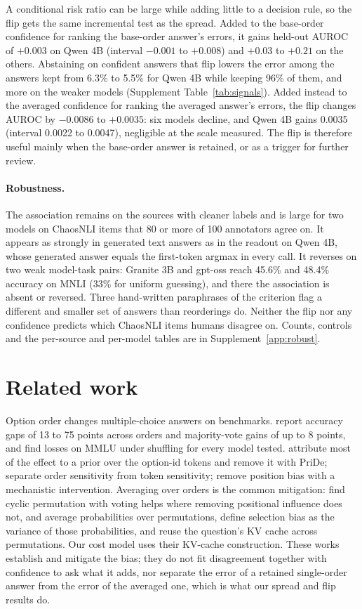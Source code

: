 \documentclass[10pt,twocolumn]{article}
\begin{document}
A conditional risk ratio can be large while adding little to a decision rule, so the flip gets the same incremental test as the spread. Added to the base-order confidence for ranking the base-order answer's errors, it gains held-out AUROC of $+0.003$ on Qwen 4B (interval $-0.001$ to $+0.008$) and $+0.03$ to $+0.21$ on the others. Abstaining on confident answers that flip lowers the error among the answers kept from 6.3\% to 5.5\% for Qwen 4B while keeping 96\% of them, and more on the weaker models (Supplement Table~\ref{tab:signals}). Added instead to the averaged confidence for ranking the averaged answer's errors, the flip changes AUROC by $-0.0086$ to $+0.0035$: six models decline, and Qwen 4B gains 0.0035 (interval 0.0022 to 0.0047), negligible at the scale measured. The flip is therefore useful mainly when the base-order answer is retained, or as a trigger for further review.

\paragraph{Robustness.} The association remains on the sources with cleaner labels and is large for two models on ChaosNLI items that 80 or more of 100 annotators agree on. It appears as strongly in generated text answers as in the readout on Qwen 4B, whose generated answer equals the first-token argmax in every call. It reverses on two weak model-task pairs: Granite 3B and gpt-oss reach 45.6\% and 48.4\% accuracy on MNLI (33\% for uniform guessing), and there the association is absent or reversed. Three hand-written paraphrases of the criterion flag a different and smaller set of answers than reorderings do. Neither the flip nor any confidence predicts which ChaosNLI items humans disagree on. Counts, controls and the per-source and per-model tables are in Supplement~\ref{app:robust}.

\section{Related work}

Option order changes multiple-choice answers on benchmarks. \citet{pezeshkpour2024order} report accuracy gaps of 13 to 75 points across orders and majority-vote gains of up to 8 points, and \citet{gupta2024changing} find losses on MMLU under shuffling for every model tested. \citet{zheng2024robust} attribute most of the effect to a prior over the option-id tokens and remove it with PriDe; \citet{wei2024unveiling} separate order sensitivity from token sensitivity; \citet{wang2024pine} remove position bias with a mechanistic intervention. Averaging over orders is the common mitigation: \citet{labelfree2026} find cyclic permutation with voting helps where removing positional influence does not, and \citet{guda2025rethinking} average probabilities over permutations, define selection bias as the variance of those probabilities, and reuse the question's KV cache across permutations. Our cost model uses their KV-cache construction. These works establish and mitigate the bias; they do not fit disagreement together with confidence to ask what it adds, nor separate the error of a retained single-order answer from the error of the averaged one, which is what our spread and flip results do.
\end{document}
